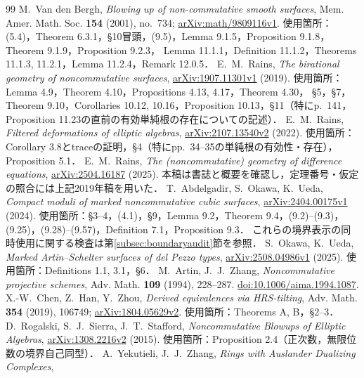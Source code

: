 \documentclass[11pt,a4paper]{ltjsarticle}
\theoremstyle{definition}
\begin{document}
\begin{thebibliography}{99}
M.~Van den Bergh, \emph{Blowing up of non-commutative smooth surfaces},
Mem. Amer. Math. Soc. \textbf{154} (2001), no.~734;
\href{https://arxiv.org/abs/math/9809116}{arXiv:math/9809116v1}.
使用箇所：(5.4)，Theorem 6.3.1，\S10冒頭，(9.5)，Lemma 9.1.5，Proposition 9.1.8，Theorem 9.1.9，Proposition 9.2.3，
Lemma 11.1.1，Definition 11.1.2，Theorems 11.1.3, 11.2.1，Lemma 11.2.4，Remark 12.0.5．
E.~M.~Rains, \emph{The birational geometry of noncommutative surfaces},
\href{https://arxiv.org/abs/1907.11301}{arXiv:1907.11301v1} (2019).
使用箇所：Lemma 4.9，Theorem 4.10，Propositions 4.13, 4.17，Theorem 4.30，
\S5，\S7，Theorem 9.10，Corollaries 10.12, 10.16，Proposition 10.13，\S11（特にp.~141，Proposition 11.23の直前の有効単純根の存在についての記述）．
E.~M.~Rains, \emph{Filtered deformations of elliptic algebras},
\href{https://arxiv.org/abs/2107.13540}{arXiv:2107.13540v2} (2022).
使用箇所：Corollary 3.8とtraceの証明，\S4（特にpp.~34--35の単純根の有効性・存在），Proposition 5.1．
E.~M.~Rains, \emph{The (noncommutative) geometry of difference equations},
\href{https://arxiv.org/abs/2504.16187}{arXiv:2504.16187} (2025).
本稿は書誌と概要を確認し，定理番号・仮定の照合には上記2019年稿を用いた．
T.~Abdelgadir, S.~Okawa, K.~Ueda,
\emph{Compact moduli of marked noncommutative cubic surfaces},
\href{https://arxiv.org/abs/2404.00175}{arXiv:2404.00175v1} (2024).
使用箇所：\S3--4，(4.1)，\S9，Lemma 9.2，Theorem 9.4，(9.2)--(9.3)，(9.25)，(9.28)--(9.57)，Definition 7.1，Proposition 9.3．
これらの境界表示の同時使用に関する検査は第\ref{subsec:boundaryaudit}節を参照．
S.~Okawa, K.~Ueda, \emph{Marked Artin--Schelter surfaces of del Pezzo types},
\href{https://arxiv.org/abs/2508.04986}{arXiv:2508.04986v1} (2025).
使用箇所：Definitions 1.1, 3.1，\S6．
M.~Artin, J.~J.~Zhang, \emph{Noncommutative projective schemes},
Adv. Math. \textbf{109} (1994), 228--287.
\href{https://doi.org/10.1006/aima.1994.1087}{doi:10.1006/aima.1994.1087}.
X.-W.~Chen, Z.~Han, Y.~Zhou, \emph{Derived equivalences via HRS-tilting},
Adv. Math. \textbf{354} (2019), 106749;
\href{https://arxiv.org/abs/1804.05629}{arXiv:1804.05629v2}.
使用箇所：Theorems A, B，\S2--3．
D.~Rogalski, S.~J.~Sierra, J.~T.~Stafford,
\emph{Noncommutative Blowups of Elliptic Algebras},
\href{https://arxiv.org/abs/1308.2216}{arXiv:1308.2216v2} (2015).
使用箇所：Proposition 2.4（正次数，無限位数の境界自己同型）．
A.~Yekutieli, J.~J.~Zhang, \emph{Rings with Auslander Dualizing Complexes},

\end{thebibliography}
\end{document}
